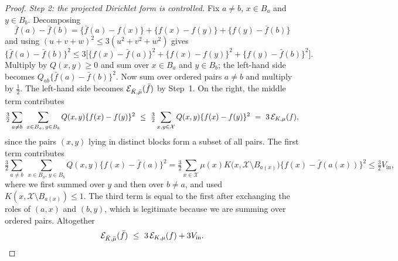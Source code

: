 \documentclass[aos]{imsart}%
\newcommand{\ambientspace}[0]{\mathcal{X}}
\theoremstyle{plain}
\theoremstyle{definition}
\begin{document}
\begin{proof}
        \emph{Step 2: the projected Dirichlet form is controlled.} Fix $a\neq
        b$, $x\in B_a$ and $y\in B_b$. Decomposing
        \begin{equation*}
            \bar f(a)-\bar f(b)
            =\{\bar f(a)-f(x)\}+\{f(x)-f(y)\}+\{f(y)-\bar f(b)\}
        \end{equation*}
        and using $(u+v+w)^{2}\leq3(u^{2}+v^{2}+w^{2})$ gives
        \begin{equation*}
            \{\bar f(a)-\bar f(b)\}^{2}\leq
            3\bigl[\{f(x)-\bar f(a)\}^{2}+\{f(x)-f(y)\}^{2}
            +\{f(y)-\bar f(b)\}^{2}\bigr].
        \end{equation*}
        Multiply by $Q(x,y)\geq0$ and sum over $x\in B_a$ and $y\in B_b$; the
        left-hand side becomes $Q_{ab}\{\bar f(a)-\bar f(b)\}^{2}$. Now sum
        over ordered pairs $a\neq b$ and multiply by $\tfrac12$. The left-hand
        side becomes $\mathcal{E}_{\bar K,\bar\mu}(\bar f)$ by Step~1. On the right,
        the middle term contributes
        \begin{equation*}
            \tfrac32\sum_{a\neq b}\ \sum_{x\in B_a,\,y\in B_b}
            Q(x,y)\{f(x)-f(y)\}^{2}
            \ \leq\ \tfrac32\sum_{x,y\in\ambientspace}Q(x,y)\{f(x)-f(y)\}^{2}
            \ =\ 3\,\Dir_{K,\mu}(f),
        \end{equation*}
        since the pairs $(x,y)$ lying in distinct blocks form a subset of all
        pairs. The first term contributes
        \begin{equation*}
            \tfrac32\sum_{a\neq b}\ \sum_{x\in B_a,\,y\in B_b}
            Q(x,y)\{f(x)-\bar f(a)\}^{2}
            =\tfrac32\sum_{x\in\ambientspace}\mu(x)
            K\bigl(x,\ambientspace\setminus B_{a(x)}\bigr)
            \{f(x)-\bar f(a(x))\}^{2}
            \leq\tfrac32V_{\mathrm{in}},
        \end{equation*}
        where we first summed over $y$ and then over $b\neq a$, and used
        $K(x,\ambientspace\setminus B_{a(x)})\leq1$. The third term is equal to
        the first after exchanging the roles of $(a,x)$ and $(b,y)$, which is
        legitimate because we are summing over ordered pairs. Altogether
        \begin{equation}
            \label{eq:binary_proj_ineq}
            \mathcal{E}_{\bar K,\bar\mu}(\bar f)
            \ \leq\ 3\,\mathcal{E}_{K,\mu}(f)+3V_{\mathrm{in}} .
        \end{equation}


\end{proof}
\end{document}
